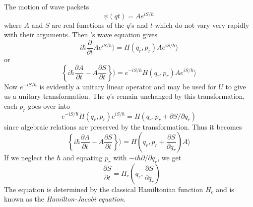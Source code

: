 {\Large The motion of wave packets}
\begin{equation}
\psi(qt) = Ae^{iS/\hbar}
\end{equation}
where $A$ and $S$ are real functions of the $q$'s and $t$ which do not vary very rapidly with their arguments. Then \sch's wave equation gives 
\begin{equation}
i\hbar \frac{\partial}{\partial t}A e^{iS/\hbar}\rangle = H(q_r, p_r) A e^{iS/\hbar} \rangle
\end{equation}
or
\begin{equation}
\left\{i\hbar \frac{\partial A}{\partial t } - A\frac{\partial S}{\partial t}\right\} \rangle= e^{-iS/\hbar} H(q_r,p_r) Ae^{iS/\hbar} \rangle
\end{equation}
Now $e^{-iS/\hbar}$ is evidently a unitary linear operator and may be used for $U$ to give us a unitary transformation. The $q$'s remain unchanged by this transformation, each $p_r$ goes over into
\begin{equation}
e^{-iS/\hbar}H(q_r,p_r)e^{iS/\hbar} = H(q_r,p_r+\partial S/\partial q_r)
\end{equation}
since algebraic relations are preserved by the transformation. Thus it becomes
\begin{equation}
\left\{i\hbar \frac{\partial A}{\partial t} -A\frac{\partial S}{\partial t}\right\}\rangle = H\left(q_r,p_r +\frac{\partial S}{\partial q_r}\right) A\rangle
\end{equation}
If we neglect the $\hbar$ and equating $p_r$ with $-i\hbar \partial/\partial q_r$, we get
\begin{equation}
-\frac{\partial S}{\partial t} = H_c\left(q_r, \frac{\partial S}{\partial q_r} \right)
\end{equation}
The equation is determined by the classical Hamiltonian function $H_c$ and is known as the \emph{Hamilton-Jacobi equation}.

